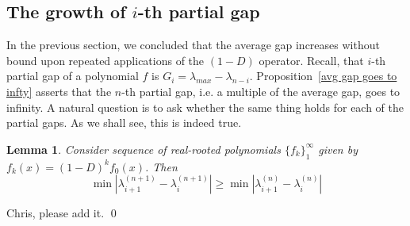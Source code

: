 \documentclass[11pt]{article}
\newtheorem{lemma}[theorem]{Lemma}
\begin{document}
\subsection{The growth of $i$-th partial gap}
In the previous section, we concluded that the average gap increases without bound upon repeated applications of the $(1-D)$ operator. Recall, that $i$-th partial gap of a polynomial $f$ is $G_i = \lambda_{max} - \lambda_{n-i}$. Proposition~\ref{avg gap goes to infty} asserts that the $n$-th partial gap, i.e. a multiple of the average gap, goes to infinity. A natural question is to ask whether the same thing holds for each of the partial gaps. As we shall see, this is indeed true.

\begin{lemma}
\label{minimal gap increases}
 Consider sequence of real-rooted polynomials $\{f_k\}_1^\infty$ given by $f_k(x) = (1-D)^k f_0(x)$. Then
 \[\min |\lambda^{(n+1)}_{i+1} - \lambda^{(n+1)}_i | \geq \min |\lambda^{(n)}_{i+1} - \lambda^{(n)}_i |\]
\end{lemma}
\proof Chris, please add it.
\qed
\end{document}
